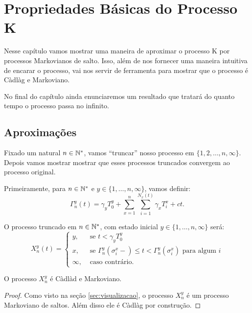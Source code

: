 \chapter{Propriedades Básicas do Processo K}
\label{cap:propriedades}

Nesse capítulo vamos mostrar uma maneira de aproximar o processo K
por processos Markovianos de salto. Isso, além de nos fornecer uma
maneira intuitiva de encarar o processo, vai nos servir de ferramenta
para mostrar que o processo é Càdlàg e Markoviano.

No final do capítulo ainda enunciaremos um resultado que tratará do
quanto tempo o processo passa no infinito.


\section{Aproximações}
\label{sec:aproximacoes}

Fixado um natural $n \in {\mathbb{N^*}}$, vamos ``truncar'' nosso processo em
$\{1, 2, \ldots, n, \infty\}$. Depois vamos mostrar mostrar que esses
processos truncados convergem ao processo original.

Primeiramente, para $n \in {\mathbb{N^*}}$ e $y \in \{1, \ldots, n, \infty\}$,
vamos definir:
\begin{equation}
  \Gamma^y_n (t) = \gamma_y T_0^y
  + \sum_{x =1}^{n} \sum_{i = 1}^{N_x(t)}
  \gamma_x T_i^x
  + ct.
\end{equation}

O processo truncado em $n \in {\mathbb{N^*}}$, com estado inicial $y \in \{1,
\ldots, n, \infty\}$ será:
\begin{equation}
  X^y_n(t) = \begin{cases}
    y, & \textrm{ se }  t < \gamma_y T_0^y\\
    x, & \textrm{ se } \Gamma^y_n(\sigma_i^x-) \leq t <
    \Gamma^y_n(\sigma^x_i)
    \textrm{ para algum } i \\
    \infty, & \textrm{ caso contrário.}
  \end{cases}
\end{equation}

\begin{proposicao}
  O processo $X_n^y$ é Càdlàd e Markoviano.
\end{proposicao}
\begin{proof}
  Como visto na seção \ref{sec:visualizacao}, o processo $X_n^y$ é um
  processo Markoviano de saltos. Além disso ele é Càdlàg por
  construção.
\end{proof}

